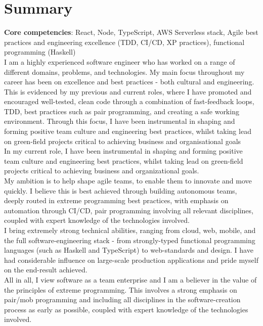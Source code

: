 \section{Summary}

\textbf{Core competencies}: React, Node, TypeScript, AWS Serverless stack, Agile best practices and engineering excellence (TDD, CI/CD, XP practices), functional programming (Haskell)\\

I am a highly experienced software engineer who has worked on a range of different domains, problems, and technologies. My main focus throughout my career has been on excellence and best practices - both cultural and engineering.\\

This is evidenced by my previous and current roles, where I have promoted and encouraged well-tested, clean code through a combination of fast-feedback loops, TDD, best practices such as pair programming, and creating a safe working environment. Through this focus, I have been instrumental in shaping and forming positive team culture and engineering best practices, whilst taking lead on green-field projects critical to achieving business and organisational goals\\

In my current role, I have been instrumental in shaping and forming positive team culture and engineering best practices, whilst taking lead on green-field projects critical to achieving business and organizational goals.\\

My ambition is to help shape agile teams, to enable them to innovate and move quickly. I believe this is best achieved through building autonomous teams, deeply routed in extreme programming best practices, with emphasis on automation through CI/CD, pair programming involving all relevant disciplines, coupled with expert knowledge of the technologies involved.\\

I bring extremely strong technical abilities, ranging from cloud, web, mobile, and the full software-engineering stack - from strongly-typed functional programming languages (such as Haskell and TypeScript) to web-standards and design. I have had considerable influence on large-scale production applications and pride myself on the end-result achieved.\\

All in all, I view software as a team enterprise and I am a believer in the value of the principles of extreme programming. This involves a strong emphasis on pair/mob programming and including all disciplines in the software-creation process as early as possible, coupled with expert knowledge of the technologies involved.\\

